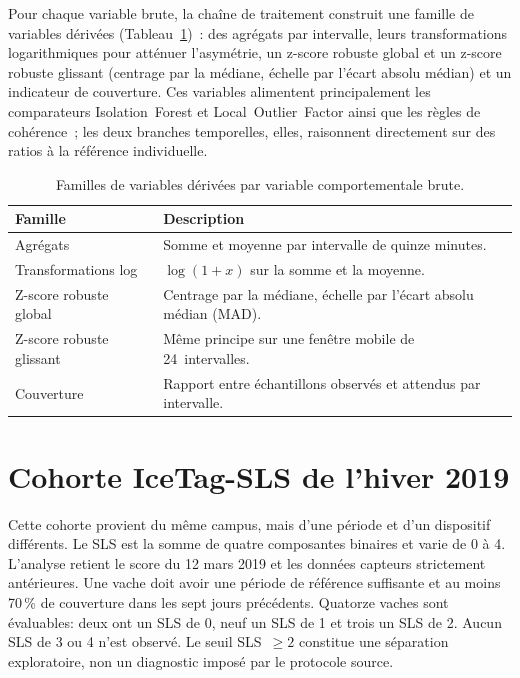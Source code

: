 Pour chaque variable brute, la chaîne de traitement construit une famille de variables dérivées
(Tableau~\ref{tab:features})~: des agrégats par intervalle, leurs transformations
logarithmiques pour atténuer l'asymétrie, un z-score robuste global et un z-score robuste
glissant (centrage par la médiane, échelle par l'écart absolu médian) et un indicateur de
couverture. Ces variables
alimentent principalement les comparateurs Isolation~Forest et Local~Outlier~Factor ainsi que
les règles de cohérence~; les deux branches temporelles, elles, raisonnent directement sur
des ratios à la référence individuelle.

\begin{table}[H]
  \centering
  \caption{Familles de variables dérivées par variable comportementale brute.}
  \label{tab:features}
  \small
  \begin{tabular}{p{}p{}}
    \toprule
    Famille & Description \\
    \midrule
    Agrégats & Somme et moyenne par intervalle de quinze minutes. \\
    Transformations log & $\log(1+x)$ sur la somme et la moyenne. \\
    Z-score robuste global & Centrage par la médiane, échelle par l'écart absolu médian (MAD). \\
    Z-score robuste glissant & Même principe sur une fenêtre mobile de 24~intervalles. \\
    Couverture & Rapport entre échantillons observés et attendus par intervalle. \\
    \bottomrule
  \end{tabular}
\end{table}

\section{Cohorte IceTag-SLS de l'hiver 2019}
\label{subsec:corpus_mcgill}

Cette cohorte provient du même campus, mais d'une période et d'un dispositif différents.
Le SLS est la somme de quatre composantes binaires et varie de 0 à 4. L'analyse retient le
score du 12 mars 2019 et les données capteurs strictement antérieures. Une vache doit avoir
une période de référence suffisante et au moins 70\,\% de couverture dans les sept jours précédents.
Quatorze vaches sont évaluables: deux ont un SLS de 0, neuf un SLS de 1 et trois un SLS de 2.
Aucun SLS de 3 ou 4 n'est observé. Le seuil SLS~$\geq2$ constitue une séparation
exploratoire, non un diagnostic imposé par le protocole source.

